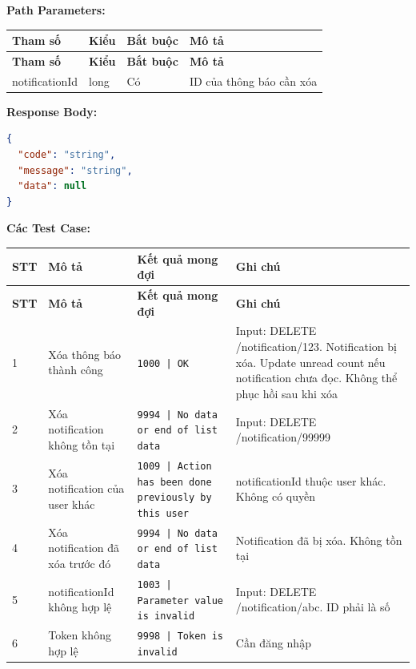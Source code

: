\textbf{Path Parameters:}

\begin{longtable}{|p{}|p{}|p{}|p{}|}
\hline
\textbf{Tham số} & \textbf{Kiểu} & \textbf{Bắt buộc} & \textbf{Mô tả} \\
\hline
\endfirsthead

\hline
\textbf{Tham số} & \textbf{Kiểu} & \textbf{Bắt buộc} & \textbf{Mô tả} \\
\hline
\endhead

\hline
\endfoot

notificationId & long & Có & ID của thông báo cần xóa \\
\hline
\end{longtable}

\textbf{Response Body:}

\begin{lstlisting}[language=json]
{
  "code": "string",
  "message": "string",
  "data": null
}
\end{lstlisting}

\textbf{Các Test Case:}

\begin{longtable}{|p{}|p{}|p{}|p{}|}
\hline
\textbf{STT} & \textbf{Mô tả} & \textbf{Kết quả mong đợi} & \textbf{Ghi chú} \\
\hline
\endfirsthead

\hline
\textbf{STT} & \textbf{Mô tả} & \textbf{Kết quả mong đợi} & \textbf{Ghi chú} \\
\hline
\endhead

\hline
\endfoot

1 & Xóa thông báo thành công & \texttt{1000 | OK} & Input: DELETE /notification/123. Notification bị xóa. Update unread count nếu notification chưa đọc. Không thể phục hồi sau khi xóa \\
\hline
2 & Xóa notification không tồn tại & \texttt{9994 | No data or end of list data} & Input: DELETE /notification/99999 \\
\hline
3 & Xóa notification của user khác & \texttt{1009 | Action has been done previously by this user} & notificationId thuộc user khác. Không có quyền \\
\hline
4 & Xóa notification đã xóa trước đó & \texttt{9994 | No data or end of list data} & Notification đã bị xóa. Không tồn tại \\
\hline
5 & notificationId không hợp lệ & \texttt{1003 | Parameter value is invalid} & Input: DELETE /notification/abc. ID phải là số \\
\hline
6 & Token không hợp lệ & \texttt{9998 | Token is invalid} & Cần đăng nhập \\
\hline
\end{longtable}
